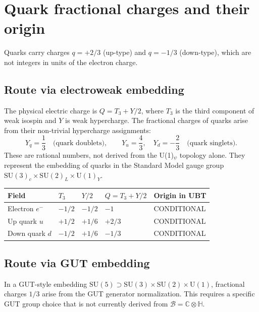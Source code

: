 \documentclass[11pt,a4paper]{article}
\begin{document}
\section{Quark fractional charges and their origin}

Quarks carry charges $q=+2/3$ (up-type) and $q=-1/3$ (down-type), which are
not integers in units of the electron charge.

\subsection{Route via electroweak embedding}

The physical electric charge is $Q=T_3+Y/2$, where $T_3$ is the third component
of weak isospin and $Y$ is weak hypercharge.  The fractional charges of quarks
arise from their non-trivial hypercharge assignments:
\begin{equation}
  Y_q=\frac{1}{3}\quad\text{(quark doublets)},
  \qquad
  Y_u=\frac{4}{3},\quad Y_d=-\frac{2}{3}\quad\text{(quark singlets)}.
\end{equation}
These are rational numbers, not derived from the U(1)$_\psi$ topology alone.
They represent the embedding of quarks in the Standard Model gauge group
$\mathrm{SU}(3)_c\times\mathrm{SU}(2)_L\times\mathrm{U}(1)_Y$.

\begin{center}
\begin{tabular}{@{}lllll@{}}
\toprule
Field & $T_3$ & $Y/2$ & $Q=T_3+Y/2$ & Origin in UBT \\
\midrule
Electron $e^-$ & $-1/2$ & $-1/2$ & $-1$ & CONDITIONAL \\
Up quark $u$ & $+1/2$ & $+1/6$ & $+2/3$ & CONDITIONAL \\
Down quark $d$ & $-1/2$ & $+1/6$ & $-1/3$ & CONDITIONAL \\
\bottomrule
\end{tabular}
\end{center}

\subsection{Route via GUT embedding}

In a GUT-style embedding $\mathrm{SU}(5)\supset\mathrm{SU}(3)\times\mathrm{SU}(2)\times\mathrm{U}(1)$,
fractional charges $1/3$ arise from the GUT generator normalization.  This
requires a specific GUT group choice that is not currently derived from
$\mathcal{B}=\mathbb{C}\otimes\mathbb{H}$.
\end{document}
